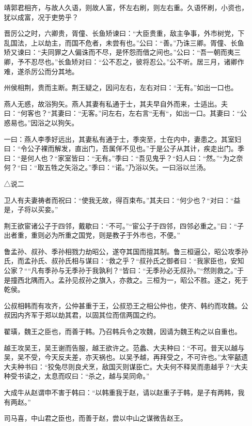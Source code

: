 \documentclass[]{article}
\begin{document}
靖郭君相齐，与故人久语，则故人富，怀左右刷，则左右重。久语怀刷，小资也，犹以成富，况于吏势乎？

晋厉公之时，六卿贵，胥僮、长鱼矫谏曰：``大臣贵重，敌主争事，外市树党，下乱国法，上以劫主，而国不危者，未尝有也。''公曰：``善。''乃诛三卿。胥僮、长鱼矫又谏曰：``夫同罪之人偏诛而不尽，是怀怨而借之间也。''公曰：``吾一朝而夷三卿，予不忍尽也。''长鱼矫对曰：``公不忍之，彼将忍公。''公不听。居三月，诸卿作难，遂杀厉公而分其地。

州侯相荆，贵而主断。荆王疑之，因问左右，左右对曰：``无有。''如出一口也。

燕人无惑，故浴狗矢。燕人其妻有私通于士，其夫早自外而来，士适出。夫曰：``何客也？``其妻曰：``无客。''问左右，左右言``无有``，如出一口。其妻曰：``公惑易也。''因浴之以狗矢。

一曰：燕人李季好远出，其妻私有通于士，季突至，士在内中，妻患之。其室妇曰：``令公子裸而解发，直出门，吾属佯不见也。''于是公子从其计，疾走出门。季曰：``是何人也？``家室皆曰：``无有。''季曰：``吾见鬼乎？``妇人曰：``然。''``为之奈何？``曰：``取五牲之矢浴之。''季曰：``诺。''乃浴以矢。一曰浴以兰汤。

△说二

卫人有夫妻祷者而祝曰：``使我无故，得百束布。''其夫曰：``何少也？``对曰：``益是，子将以买妾。''

荆王欲宦诸公子于四邻，戴歇曰：``不可。''``宦公子于四邻，四邻必重之。''曰：``子出者重，重则必为所重之国党，则是教子于外市也，不便。''

鲁孟孙、叔孙、季孙相戮力劫昭公，遂夺其国而擅其制。鲁三桓逼公，昭公攻季孙氏，而孟孙氏、叔孙氏相与谋曰：``救之乎？``叔孙氏之御者曰：``我家臣也，安知公家？````凡有季孙与无季孙于我孰利？``皆曰：``无季孙必无叔孙。''``然则救之。''于是撞西北隅而入。孟孙见叔孙之旗入，亦救之。三桓为一，昭公不胜。逐之，死于乾侯。

公叔相韩而有攻齐，公仲甚重于王，公叔恐王之相公仲也，使齐、韩约而攻魏。公叔因内齐军于郑以劫其君，以固其位而信两国之约。

翟璜，魏王之臣也，而善于韩。乃召韩兵令之攻魏，因请为魏王构之以自重也。

越王攻吴王，吴王谢而告服，越王欲许之。范蠡、大夫种曰：``不可。昔天以越与吴，吴不受，今天反夫差，亦天祸也。以吴予越，再拜受之，不可许也。''太宰嚭遗大夫种书曰：``狡兔尽则良犬烹，敌国灭则谋臣亡。大夫何不释吴而患越乎？``大夫种受书读之，太息而叹曰：``杀之，越与吴同命。''

大成牛从赵谓申不害于韩曰：``以韩重我于赵，请以赵重子于韩，是子有两韩，我有两赵。''

司马喜，中山君之臣也，而善于赵，尝以中山之谋微告赵王。
\end{document}

